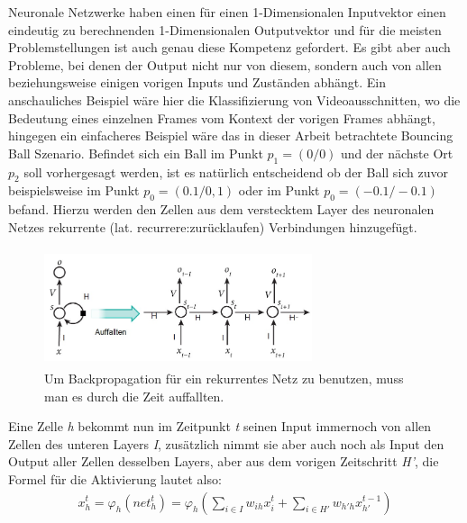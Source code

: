 Neuronale Netzwerke haben einen für einen 1-Dimensionalen Inputvektor einen eindeutig zu berechnenden 1-Dimensionalen Outputvektor und für die meisten Problemstellungen ist auch genau diese Kompetenz gefordert. Es gibt aber auch Probleme, bei denen der Output nicht nur von diesem, sondern auch von allen beziehungsweise einigen vorigen Inputs und Zuständen abhängt. Ein anschauliches Beispiel wäre hier die Klassifizierung von Videoausschnitten, wo die Bedeutung eines einzelnen Frames vom Kontext der vorigen Frames abhängt, hingegen ein einfacheres Beispiel wäre das in dieser Arbeit betrachtete Bouncing Ball Szenario. Befindet sich ein Ball im Punkt \(p_{1}=(0/0)\) und der nächste Ort \(p_{2}\) soll vorhergesagt werden, ist es natürlich entscheidend ob der Ball sich zuvor beispielsweise im Punkt \(p_{0}=(0.1/0,1)\) oder im Punkt \(p_{0}=(-0.1/-0.1)\) befand. Hierzu werden den Zellen aus dem verstecktem Layer des neuronalen Netzes rekurrente (lat. recurrere:zurücklaufen) Verbindungen hinzugefügt.
\begin{figure}
	\centering
	\includegraphics[width=0.7\textwidth, height=130px]{pics/rnn.jpg}	
	\caption{Um Backpropagation für ein rekurrentes Netz zu benutzen, muss man es durch die Zeit auffallten. \cite{bib:rnn}}
	\label{img:rnn}
\end{figure}
Eine Zelle \textit{h} bekommt nun im Zeitpunkt \textit{t} seinen Input immernoch von allen Zellen des unteren Layers \textit{I}, zusätzlich nimmt sie aber auch noch als Input den Output aller Zellen desselben Layers, aber aus dem vorigen Zeitschritt \textit{H'}, die Formel für die Aktivierung lautet also: 
\begin{gather}
x^{t}_{h}=\varphi_{h}(net_{h}^{t})=\varphi_{h}(\sum_{i \in I}w_{ih}x^{t}_{i}+\sum_{i \in H'}w_{h'h}x^{t-1}_{h'})
\end{gather}

